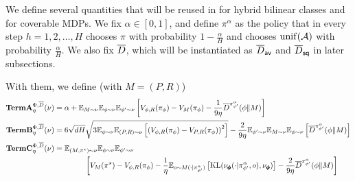\begin{definition}
    We define several quantities that will be reused in  for hybrid bilinear classes and  for coverable MDPs. 
    We fix $\alpha\in[0,1]$, and define $\pi^\alpha$ as the policy that in every step $h=1,2,\ldots, H$ chooses $\pi$ with probability $1-\frac{\alpha}{H}$ and chooses $\operatorname*{unif}(\mathcal{A})$ with probability $\frac{\alpha}{H}$. We also fix $\overline{D}$, which will be instantiated as $\overline{D}_{\mathsf{av}}$ and $\overline{D}_{\mathsf{sq}}$ in later subsections. 

    With them, we define (with $M=(P,R)$)
    \begin{align*}
        \textbf{\textup{TermA}}_\eta^{\Phi, \overline{D}}(\nu) 
        &= \alpha + \mathbb{E}_{M \sim \nu}\mathbb{E}_{\phi \sim \nu} \mathbb{E}_{\phi'\sim \nu}\left[  V_{\phi, R}(\pi_{\phi}) - V_M(\pi_\phi) - \frac{1}{9\eta} \overline{D}^{\pi_{\phi'}^\alpha}(\phi\|M)\right]
\\
\textbf{\textup{TermB}}_\eta^{\Phi, \overline{D}}(\nu) &= 6\sqrt{dH}\sqrt{3\mathbb{E}_{\phi \sim \nu}\mathbb{E}_{(P,R) \sim \nu}\left[\left(V_{\phi, R}(\pi_{\phi}) - V_{P,R}(\pi_{\phi}) \right)^2\right]} - \frac{2}{9\eta}\mathbb{E}_{\phi' \sim \nu}\mathbb{E}_{M \sim \nu}\mathbb{E}_{\phi \sim \nu}\left[\overline{D}^{\pi_{\phi'}^\alpha}(\phi\|M)\right]
\\
\textbf{\textup{TermC}}_\eta^{\Phi, \overline{D}}(\nu) 
        &= \mathbb{E}_{(M, \pi^\star) \sim \nu}\mathbb{E}_{\phi \sim \nu} \mathbb{E}_{\phi'\sim \nu} \\
        &\qquad\qquad  \left[ V_M(\pi^\star) - V_{\phi, R}(\pi_{\phi}) - \frac{1}{\eta}\mathbb{E}_{o\sim M(\cdot|\pi_{\phi'}^\alpha)}\left[\text{KL}(\nu_{\pmb{\phi}}(\cdot|\pi_{\phi'}^\alpha, o), \nu_{\pmb{\phi}})\right] - \frac{2}{9\eta} \overline{D}^{\pi_{\phi'}^\alpha}(\phi\|M)\right]
    \end{align*}
\end{definition}

